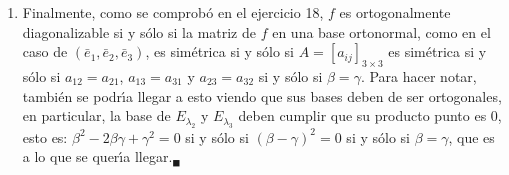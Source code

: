 \begin{solucion}
\begin{enumerate}[$a$)]
  \item Finalmente, como se comprob\'o en el ejercicio 18, $f$ es ortogonalmente diagonalizable si y s\'olo si la matriz de $f$ en una base ortonormal, como en el caso de $(\bar{e}_1, \bar{e}_2, \bar{e}_3)$, es sim\'etrica si y s\'olo si $A = [a_{ij}]_{3\times 3}$ es sim\'etrica si y s\'olo si $a_{12} = a_{21}$, $a_{13} = a_{31}$ y $a_{23} = a_{32}$ si y s\'olo si $\beta = \gamma$. Para hacer notar, tambi\'en se podr\'{\i}a llegar a esto viendo que sus bases deben de ser ortogonales, en particular, la base de $E_{\lambda_2}$ y $E_{\lambda_3}$ deben cumplir que su producto punto es $0$, esto es: $\beta^2 - 2\beta\gamma + \gamma^2 = 0$ si y s\'olo si $(\beta - \gamma)^2 = 0$ si y s\'olo si $\beta = \gamma$, que es a lo que se quer\'{\i}a llegar.${}_{\blacksquare}$
 \end{enumerate}

\end{solucion}
